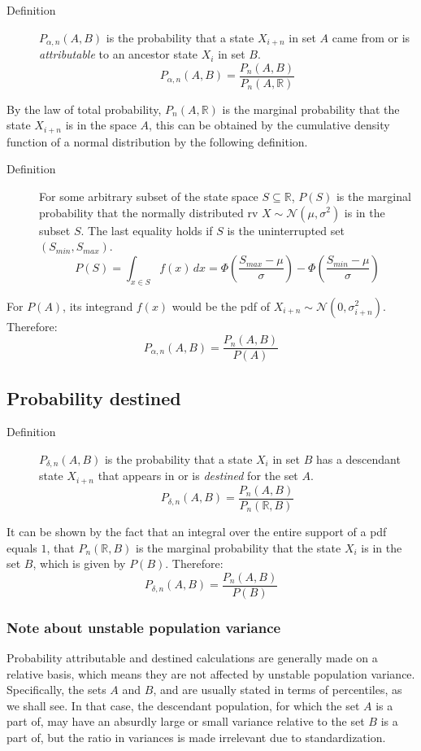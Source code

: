 \documentclass[letterpaper,10pt]{article} %
\begin{document}
\begin{description}
\item [Definition] $P_{\alpha , n}(A, B)$ is the probability that a state $X_{i+n}$ in set $A$ came from or is \emph{attributable} to an ancestor state $X_i$ in set $B$.
$$P_{\alpha , n}(A, B) = \frac{P_n(A, B)}{P_n(A, \mathbb{R})}$$
\end{description}

By the law of total probability, $P_n(A, \mathbb{R})$ is the marginal probability that the state $X_{i+n}$ is in the space $A$, this can be obtained by the cumulative density function of a normal distribution by the following definition.

\begin{description}
\item [Definition] For some arbitrary subset of the state space $S \subseteq \mathbb{R}$, $P(S)$ is the marginal probability that the normally distributed rv $X \sim \mathcal{N}(\mu, \sigma^2)$ is in the subset $S$. The last equality holds if $S$ is the uninterrupted set $(S_{min}, S_{max})$.
$$P(S) = \int_{x\in S} f(x) \, dx = \Phi(\frac{S_{max} - \mu}{\sigma}) - \Phi(\frac{S_{min} - \mu}{\sigma})$$
\end{description}

For $P(A)$, its integrand $f(x)$ would be the pdf of $X_{i+n} \sim \mathcal{N}(0, \sigma_{i+n}^2)$. Therefore:
%
$$P_{\alpha , n}(A, B) = \frac{P_n(A, B)}{P(A)}$$

\subsection{Probability destined}

\begin{description}
\item [Definition] $P_{\delta , n}(A, B)$ is the probability that a state $X_i$ in set $B$ has a descendant state $X_{i+n}$ that appears in or is \emph{destined} for the set $A$. 
$$P_{\delta , n}(A, B) = \frac{P_n(A, B)}{P_n(\mathbb{R}, B)}$$
\end{description}

It can be shown by the fact that an integral over the entire support of a pdf equals $1$, that $P_n(\mathbb{R}, B)$ is the marginal probability that the state $X_i$ is in the set $B$, which is given by $P(B)$. Therefore:
%
$$P_{\delta , n}(A, B) = \frac{P_n(A, B)}{P(B)}$$


\subsubsection*{Note about unstable population variance}
Probability attributable and destined calculations are generally made on a relative basis, which means they are not affected by unstable population variance. Specifically, the sets $A$ and $B$, and are usually stated in terms of percentiles, as we shall see. In that case, the descendant population, for which the set $A$ is a part of, may have an absurdly large or small variance relative to the set $B$ is a part of, but the ratio in variances is made irrelevant due to standardization.
\end{document}
